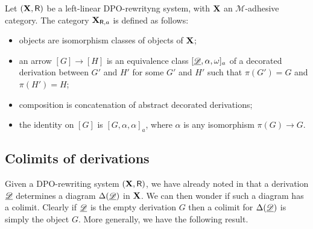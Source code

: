 \begin{definition}
	Let $(\textbf {\textup{X}}, \mathsf{R})$ be a left-linear DPO-rewrityng system, with $\textbf {\textup{X}}$ an $\mathcal{M}$-adhesive category. The  category $\textbf {\textup{X}}_{\mathsf{R}, a}$ is defined as follows:
	\begin{itemize}
		\item objects are isomorphism classes of objects of $\textbf {\textup{X}}$;
		\item an arrow $[G]\to [H]$ is an equivalence class $[\underline{\mathscr{D}}, \alpha, \omega]_a$ of a decorated derivation between $G'$ and $H'$ for some $G'$ and $H'$ such that $\pi(G')=G$ and $\pi(H')=H$;
		\item composition is concatenation of abstract decorated derivations;
		\item the identity on $[G]$ is $[G, \alpha, \alpha]_a$, where $\alpha$ is any isomorphism $\pi(G)\to G$.	\end{itemize}
\end{definition}




\subsection{Colimits of derivations}\label{subsec:col}
Given a DPO-rewriting system $(\textbf {\textup{X}}, \mathsf{R})$,  we have already noted in  that a derivation $\underline{\mathscr{D}}$  determines a diagram $\Delta(\underline{\mathscr{D}})$ in $\textbf {\textup{X}}$. We can then wonder if such a diagram has a colimit. Clearly if $\underline{\mathscr{D}}$ is the empty derivation $G$ then a colimit for $\Delta(\underline{\mathscr{D}})$ is simply the object $G$. More generally, we have the following result.

